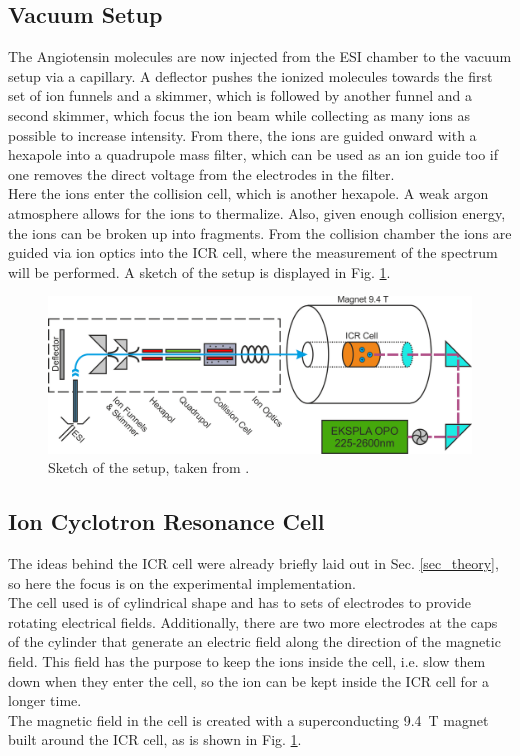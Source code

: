\documentclass[a4paper,10pt]{article}
\begin{document}
\subsection{Vacuum Setup}
The Angiotensin molecules are now injected from the ESI chamber to the vacuum setup via a capillary. A deflector pushes the ionized molecules towards the first set of ion funnels and a skimmer, which is followed by another funnel and a second skimmer, which focus the ion beam while collecting as many ions as possible to increase intensity. From there, the ions are guided onward with a hexapole into a quadrupole mass filter, which can be used as an ion guide too if one removes the direct voltage from the electrodes in the filter. \\
Here the ions enter the collision cell, which is another hexapole. A weak argon atmosphere allows for the ions to thermalize. 
Also, given enough collision energy, the ions can be broken up into fragments. From the collision chamber the ions are guided via ion optics into the ICR cell, where the measurement of the spectrum will be performed. A sketch of the setup is displayed in Fig. \ref{fig_setup}. 
\begin{figure}[htp!]
	\centering
	\includegraphics[width= 0.6 \textwidth]{setup.png}
	\caption{Sketch of the setup, taken from \cite{script}.}
	\label{fig_setup}
\end{figure}

\subsection{Ion Cyclotron Resonance Cell}
The ideas behind the ICR cell were already briefly laid out in Sec. \ref{sec_theory}, so here the focus is on the experimental implementation. \\
The cell used is of cylindrical shape and has to sets of electrodes to provide rotating electrical fields. Additionally, there are two more electrodes at the caps of the cylinder that generate an electric field along the direction of the magnetic field. This field has the purpose to keep the ions inside the cell, i.e. slow them down when they enter the cell, so the ion can be kept inside the ICR cell for a longer time. \\
The magnetic field in the cell is created with a superconducting \SI{9.4}{\tesla} magnet built around the ICR cell, as is shown in Fig. \ref{fig_setup}. 
\end{document}

